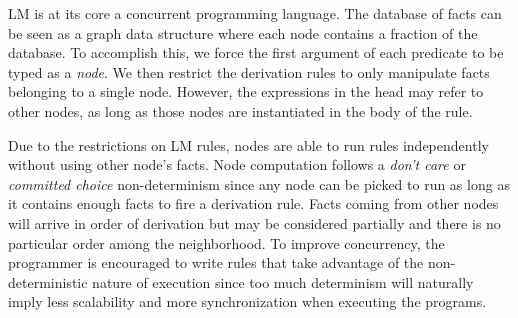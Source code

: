 LM is at its core a concurrent programming language. The database of
facts can be seen as a graph data structure where each node contains a
fraction of the database.  To accomplish this, we force the first
argument of each predicate to be typed as a \emph{node}. We then
restrict the derivation rules to only manipulate facts belonging to a
single node.  However, the expressions in the head may refer to other
nodes, as long as those nodes are instantiated in the body of the
rule.

Due to the restrictions on LM rules, nodes are able to run rules
independently without using other node's facts. Node computation
follows a \emph{don't care} or \emph{committed choice} non-determinism
since any node can be picked to run as long as it contains enough
facts to fire a derivation rule.  Facts coming from other nodes will
arrive in order of derivation but may be considered partially and
there is no particular order among the neighborhood. To improve
concurrency, the programmer is encouraged to write rules that take
advantage of the non-deterministic nature of execution since too much
determinism will naturally imply less scalability and more synchronization
when executing the programs.
